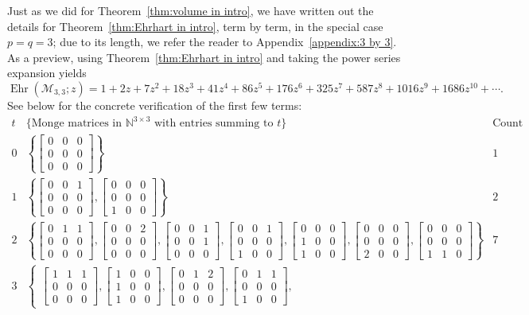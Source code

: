 \documentclass[noamsfonts,10pt]{amsart}
\newcommand{\N}{\mathbb{N}}
\newcommand{\M}{\mathcal{M}}
\DeclareMathOperator{\Ehr}{Ehr}
\newcommand{\1}{\mathbf{1}}
\newcommand{\mat}[1]{\left[ \begin{smallmatrix} #1 \end{smallmatrix} \right]}
\theoremstyle{plain}
\theoremstyle{definition}
\numberwithin{equation}{section}
\begin{document}
Just as we did for Theorem~\ref{thm:volume in intro}, we have written out the details for Theorem~\ref{thm:Ehrhart in intro}, term by term, in the special case $p=q=3$; due to its length, we refer the reader to Appendix~\ref{appendix:3 by 3}.
As a preview, using Theorem~\ref{thm:Ehrhart in intro} and taking the power series expansion yields
\[
    \Ehr(\M_{3,3}; z) = 1 + 2 z + 7 z^2 + 18 z^3 + 41 z^4 + 86 z^5 + 176 z^6 + 325 z^7 + 
 587 z^8 + 1016 z^9 + 1686 z^{10} + \cdots.
\]
See below for the concrete verification of the first few terms:
\begingroup
\renewcommand{\arraystretch}{1.5}
\[
\begin{array}{c|l|c}
    t & \Big\{\text{Monge matrices in $\N^{3 \times 3}$ with entries summing to $t$}\Big\} & \text{Count} \\ \hline
    0 & \left\{\mat{0&0&0\\0&0&0\\0&0&0} \right\} & 1 \\[2ex]
    1 & \left\{ \mat{0&0&1\\0&0&0\\0&0&0}, \mat{0&0&0\\0&0&0\\1&0&0} \right\} & 2 \\[2ex]
    2 & \left\{ \mat{0&1&1\\0&0&0\\0&0&0}, \mat{0&0&2\\0&0&0\\0&0&0}, \mat{0&0&1\\0&0&1\\0&0&0}, \mat{0&0&1\\0&0&0\\1&0&0}, \mat{0&0&0\\1&0&0\\1&0&0}, \mat{0&0&0\\0&0&0\\2&0&0}, \mat{0&0&0\\0&0&0\\1&1&0} \right\} & 7 \\[2ex]
    3 & \left\{ \begin{array}{l} \mat{1&1&1\\0&0&0\\0&0&0},
\mat{1&0&0\\1&0&0\\1&0&0},
\mat{0&1&2\\0&0&0\\0&0&0},
\mat{0&1&1\\0&0&0\\1&0&0},

\end{array}
\end{array}\]
\end{document}
